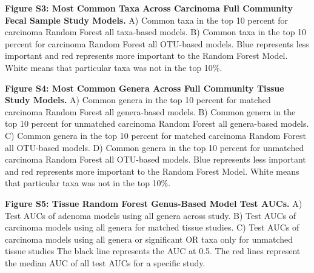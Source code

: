 \documentclass[12pt,]{article}
\begin{document}
\textbf{Figure S3: Most Common Taxa Across Carcinoma Full Community
Fecal Sample Study Models.} A) Common taxa in the top 10 percent for
carcinoma Random Forest all taxa-based models. B) Common taxa in the top
10 percent for carcinoma Random Forest all OTU-based models. Blue
represents less important and red represents more important to the
Random Forest Model. White means that particular taxa was not in the top
10\%.

\textbf{Figure S4: Most Common Genera Across Full Community Tissue Study
Models.} A) Common genera in the top 10 percent for matched carcinoma
Random Forest all genera-based models. B) Common genera in the top 10
percent for unmatched carcinoma Random Forest all genera-based models.
C) Common genera in the top 10 percent for matched carcinoma Random
Forest all OTU-based models. D) Common genera in the top 10 percent for
unmatched carcinoma Random Forest all OTU-based models. Blue represents
less important and red represents more important to the Random Forest
Model. White means that particular taxa was not in the top 10\%.

\textbf{Figure S5: Tissue Random Forest Genus-Based Model Test AUCs.} A)
Test AUCs of adenoma models using all genera across study. B) Test AUCs
of carcinoma models using all genera for matched tissue studies. C) Test
AUCs of carcinoma models using all genera or significant OR taxa only
for unmatched tissue studies The black line represents the AUC at 0.5.
The red lines represent the median AUC of all test AUCs for a specific
study.

\newpage
\end{document}
